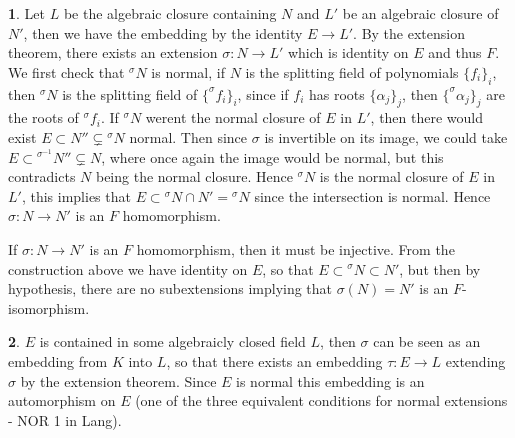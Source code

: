 \documentclass[11pt]{article}
\theoremstyle{definition}
\newtheorem{pb}{}
\newcommand{\set}[1]{\{#1\}}
\begin{document}
    \begin{pb}
        Let \(L\) be the algebraic closure containing \(N\) and \(L'\) be an algebraic closure of \(N'\), then we have the embedding by the identity \(E \to L'\). 
        By the extension theorem, there exists an extension \(\sigma: N \to L'\)
        which is identity on \(E\) and thus \(F\). We first check that \(^\sigma N\) is normal, if \(N\) is the splitting field of polynomials \(\set{f_i}_i\), then \(^\sigma N\)
        is the splitting field of \(\set{^\sigma f_i}_i\), since if \(f_i\) has roots \(\set{\alpha_j}_j\), then \(\set{^\sigma \alpha_j}_j\) are the roots of \(^\sigma f_i\). 
        If \(^\sigma N\) werent the normal closure of \(E\) in \(L'\), then there would exist \(E \subset N'' \subsetneq {}^\sigma N\) normal. Then since \(\sigma\) is invertible on its image,
        we could take \(E \subset {}^{\sigma^{-1}} N'' \subsetneq N\), where once again the image would be normal, but this contradicts \(N\) being the normal closure. Hence \(^\sigma N\) is the
        normal closure of \(E\) in \(L'\), this implies that \(E \subset {}^\sigma N \cap N' = {}^\sigma N\) since the intersection is normal. Hence \(\sigma: N \to N'\) is an \(F\) homomorphism.

        If \(\sigma: N \to N'\) is an \(F\) homomorphism, then it must be injective. From the construction above we have identity on \(E\), so that \(E \subset {}^\sigma N \subset N'\), but then
        by hypothesis, there are no subextensions implying that \(\sigma(N) = N'\) is an \(F\)-isomorphism.
    \end{pb}
    \begin{pb}
        \(E\) is contained in some algebraicly closed field \(L\), then \(\sigma\) can be seen as an embedding from \(K\) into \(L\), so that there exists an embedding \(\tau:E \to L\) extending
        \(\sigma\) by the extension theorem. Since \(E\) is normal this embedding is an automorphism on \(E\) (one of the three equivalent conditions for normal extensions - NOR 1 in Lang).
    \end{pb}
\end{document}
